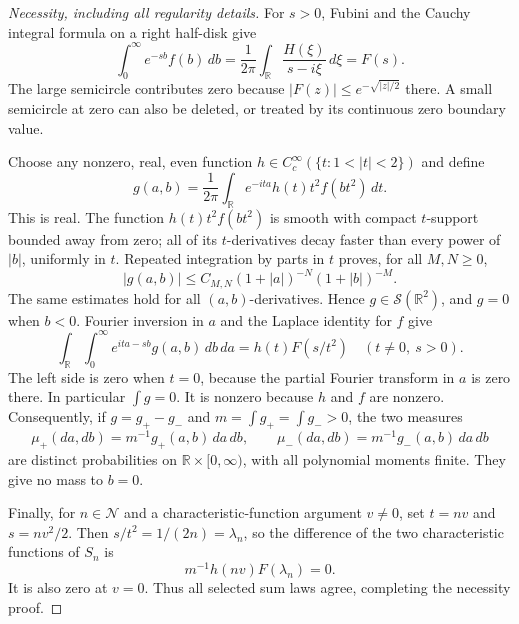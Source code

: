 \documentclass[11pt,letterpaper]{article}
\theoremstyle{definition}
\theoremstyle{remark}
\newcommand{\1}{\mathbf 1}
\begin{document}
\begin{proof}[Necessity, including all regularity details]
For $s>0$, Fubini and the Cauchy integral formula on a right half-disk
give
\[
 \int_0^\infty e^{-sb}f(b)\,db
 =\frac1{2\pi}\int_{\mathbb R}\frac{H(\xi)}{s-i\xi}\,d\xi
 =F(s).
\]
The large semicircle contributes zero because
$|F(z)|\le e^{-\sqrt{|z|/2}}$ there.  A small semicircle at zero can
also be deleted, or treated by its continuous zero boundary value.

Choose any nonzero, real, even function
$h\in C_c^\infty(\{t:1<|t|<2\})$ and define
\[
 g(a,b)=\frac1{2\pi}\int_{\mathbb R}
       e^{-ita}h(t)t^2f(bt^2)\,dt.
\]
This is real.  The function $h(t)t^2f(bt^2)$ is smooth with compact
$t$-support bounded away from zero; all of its $t$-derivatives decay
faster than every power of $|b|$, uniformly in $t$.  Repeated
integration by parts in $t$ proves, for all $M,N\ge0$,
\[
 |g(a,b)|\le C_{M,N}(1+|a|)^{-N}(1+|b|)^{-M}.
\]
The same estimates hold for all $(a,b)$-derivatives.  Hence
$g\in\mathcal S(\mathbb R^2)$, and $g=0$ when $b<0$.  Fourier
inversion in $a$ and the Laplace identity for $f$ give
\[
 \int_{\mathbb R}\int_0^\infty e^{ita-sb}g(a,b)\,db\,da
      =h(t)F(s/t^2) \quad(t\ne0,\ s>0).
\]
The left side is zero when $t=0$, because the partial Fourier
transform in $a$ is zero there.  In particular $\int g=0$.
It is nonzero because $h$ and $f$ are nonzero.  Consequently, if
$g=g_+-g_-$ and $m=\int g_+=\int g_->0$, the two measures
\[
 \mu_+(da,db)=m^{-1}g_+(a,b)\,da\,db,
 \qquad
 \mu_-(da,db)=m^{-1}g_-(a,b)\,da\,db
\]
are distinct probabilities on $\mathbb R\times[0,\infty)$, with all
polynomial moments finite.  They give no mass to $b=0$.

Finally, for $n\in\mathcal N$ and a characteristic-function argument
$v\ne0$, set $t=nv$ and $s=nv^2/2$.  Then $s/t^2=1/(2n)=\lambda_n$,
so the difference of the two characteristic functions of $S_n$ is
\[
 m^{-1}h(nv)F(\lambda_n)=0.
\]
It is also zero at $v=0$.  Thus all selected sum laws agree, completing
the necessity proof.
\end{proof}
\end{document}
